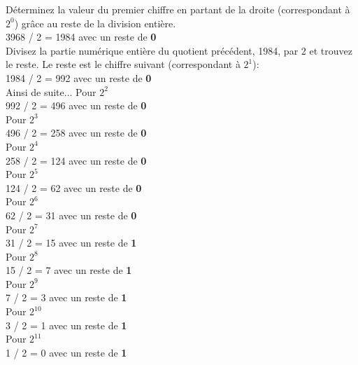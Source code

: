 \begin{Exercice}[20 minutes]
\begin{solution}
        
        Déterminez la valeur du premier chiffre en partant de la droite (correspondant à $2^0$) grâce au reste de la division entière.\\
        3968 / 2 = 1984 avec un reste de \textbf{0}\\
        Divisez la partie numérique entière du quotient précédent, 1984, par 2 et trouvez le reste. Le reste est le chiffre suivant (correspondant à $2^1$):\\
        1984 / 2 = 992 avec un reste de \textbf{0}\\
        Ainsi de suite... Pour $2^2$\\
        992 / 2 = 496 avec un reste de \textbf{0}\\
        Pour $2^3$\\
        496 / 2 = 258 avec un reste de \textbf{0}\\
        Pour $2^4$\\
        258 / 2 = 124 avec un reste de \textbf{0}\\
        Pour $2^5$\\
        124 / 2 = 62 avec un reste de \textbf{0}\\
        Pour $2^6$\\
        62 / 2 = 31 avec un reste de \textbf{0}\\
        Pour $2^7$\\
        31 / 2 = 15 avec un reste de \textbf{1}\\
        Pour $2^8$\\
        15 / 2 = 7 avec un reste de \textbf{1}\\
        Pour $2^9$\\
        7 / 2 = 3 avec un reste de \textbf{1}\\
        Pour $2^10$\\
        3 / 2 = 1 avec un reste de \textbf{1}\\
        Pour $2^11$\\
        1 / 2 = 0 avec un reste de \textbf{1}\\\\


\end{solution}
\end{Exercice}
